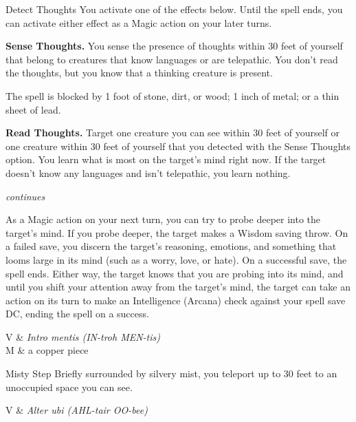 \begin{Spell}[
  tags=Concentration,
  level={2nd},
  time={1 action},
  range={Self},
  components={V, S, M},
  duration={1 minute},
  school={Divination},
  attack={WIS Save},
  effect={Detection}
]{Detect Thoughts}
You activate one of the effects below. Until the spell ends, you can activate either effect as a Magic action on your later turns.

\textbf{Sense Thoughts.} You sense the presence of thoughts within 30 feet of yourself that belong to creatures that know languages or are telepathic. You don't read the thoughts, but you know that a thinking creature is present.

The spell is blocked by 1 foot of stone, dirt, or wood; 1 inch of metal; or a thin sheet of lead.

\textbf{Read Thoughts.} Target one creature you can see within 30 feet of yourself or one creature within 30 feet of yourself that you detected with the Sense Thoughts option. You learn what is most on the target's mind right now. If the target doesn't know any languages and isn't telepathic, you learn nothing.

\hfill \textit{\footnotesize continues}
\newpage
{}

As a Magic action on your next turn, you can try to probe deeper into the target's mind. If you probe deeper, the target makes a Wisdom saving throw. On a failed save, you discern the target's reasoning, emotions, and something that looms large in its mind (such as a worry, love, or hate). On a successful save, the spell ends. Either way, the target knows that you are probing into its mind, and until you shift your attention away from the target's mind, the target can take an action on its turn to make an Intelligence (Arcana) check against your spell save DC, ending the spell on a success.

\begin{components}
V & \textit{Intro mentis (IN-troh MEN-tis)} \\
M & a copper piece
\end{components}
\end{Spell}


\begin{Spell}[
  level={2nd},
  time={1 bonus action},
  range={Self},
  components={V},
  duration={Instantaneous},
  school={Conjuration},
  attack={None},
  effect={Teleportation}
]{Misty Step}
Briefly surrounded by silvery mist, you teleport up to 30 feet to an unoccupied space you can see.

\begin{components}
V & \textit{Alter ubi (AHL-tair OO-bee)}
\end{components}
\end{Spell}


